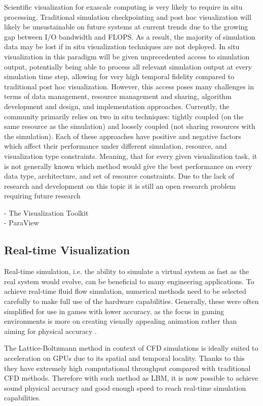Scientific visualization for exascale computing is very likely to require in situ processing. Traditional simulation checkpointing and post hoc visualization will likely be unsustainable on future systems at current trends due to the growing gap between I/O bandwidth and FLOPS. As a result, the majority of simulation data may be lost if in situ visualization techniques are not deployed. In situ visualization in this paradigm will be given unprecedented access to simulation output, potentially being able to process all relevant simulation output at every simulation time step, allowing for very high temporal fidelity compared to traditional post hoc visualization. However, this access poses many challenges in terms of data management, resource management and sharing, algorithm development and design, and implementation approaches. Currently, the community primarily relies on two in situ techniques: tightly coupled (on the same resource as the simulation) and loosely coupled (not sharing resources with the simulation). Each of these approaches have positive and negative factors which affect their performance under different simulation, resource, and visualization type constraints. Meaning, that for every given visualization task, it is not generally known which method would give the best performance on every data type, architecture, and set of resource constraints. Due to the lack of research and development on this topic it is still an open research problem requiring future research
\citep{kressSituVisualizationTechniques}

- The Visualization Toolkit \\
- ParaView \\


\subsection{Real-time Visualization}
\label{rt-viz}
Real-time simulation, i.e. the ability to simulate a virtual system as fast as the real system would evolve, can be beneficial to many engineering applications. To achieve real-time fluid flow simulation, numerical methods need to be selected carefully to make full use of the hardware capabilities. Generally, these were often simplified for use in games with lower accuracy, as the focus in gaming environments is more on creating visually appealing animation rather than aiming for physical accuracy \citep{delboscRealTimeSimulationIndoor}.

The Lattice-Boltzmann method in context of CFD simulations is ideally suited to acceleration on GPUs due to its spatial and temporal locality. Thanks to this they have extremely high computational throughput compared with traditional CFD methods. Therefore with such method as LBM, it is now possible to achieve sound physical accuracy and good enough speed to reach real-time simulation capabilities.

